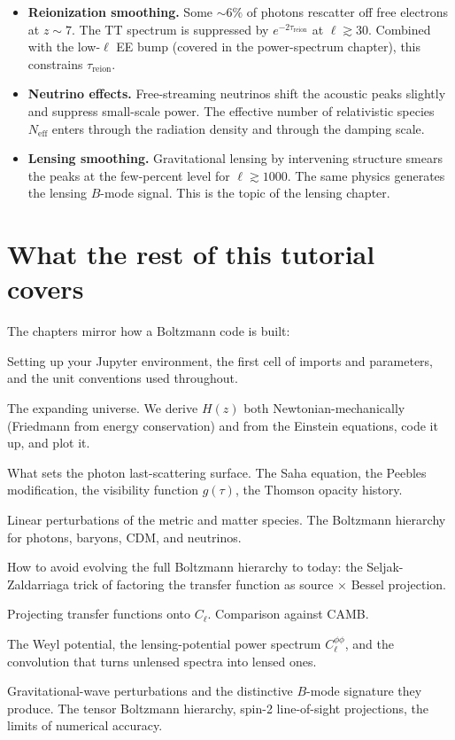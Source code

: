 \begin{itemize}[leftmargin=*]
  \item \textbf{Reionization smoothing.}
    Some $\sim 6\%$ of photons rescatter off free electrons at $z \sim 7$. The TT spectrum is suppressed by $e^{-2\tau_\mathrm{reion}}$ at $\ell \gtrsim 30$. Combined with the low-$\ell$ EE bump (covered in the power-spectrum chapter), this constrains $\tau_\mathrm{reion}$.

  \item \textbf{Neutrino effects.}
    Free-streaming neutrinos shift the acoustic peaks slightly and suppress small-scale power. The effective number of relativistic species $N_\mathrm{eff}$ enters through the radiation density and through the damping scale.

  \item \textbf{Lensing smoothing.}
    Gravitational lensing by intervening structure smears the peaks at the few-percent level for $\ell \gtrsim 1000$. The same physics generates the lensing $B$-mode signal. This is the topic of the lensing chapter.
\end{itemize}

\section*{What the rest of this tutorial covers}

The chapters mirror how a Boltzmann code is built:

\begin{description}[leftmargin=2.5em,style=nextline]
  \item[Prerequisites] Setting up your Jupyter environment, the first cell of imports and parameters, and the unit conventions used throughout.
  \item[1. Background] The expanding universe. We derive $H(z)$ both Newtonian-mechanically (Friedmann from energy conservation) and from the Einstein equations, code it up, and plot it.
  \item[2. Recombination] What sets the photon last-scattering surface. The Saha equation, the Peebles modification, the visibility function $g(\tau)$, the Thomson opacity history.
  \item[3. Perturbations] Linear perturbations of the metric and matter species. The Boltzmann hierarchy for photons, baryons, CDM, and neutrinos.
  \item[4. Line-of-sight integration] How to avoid evolving the full Boltzmann hierarchy to today: the Seljak-Zaldarriaga trick of factoring the transfer function as source $\times$ Bessel projection.
  \item[5. Power spectra] Projecting transfer functions onto $C_\ell$. Comparison against CAMB.
  \item[6. Lensing] The Weyl potential, the lensing-potential power spectrum $C_\ell^{\phi\phi}$, and the convolution that turns unlensed spectra into lensed ones.
  \item[7. Tensors] Gravitational-wave perturbations and the distinctive $B$-mode signature they produce. The tensor Boltzmann hierarchy, spin-2 line-of-sight projections, the limits of numerical accuracy.
\end{description}

